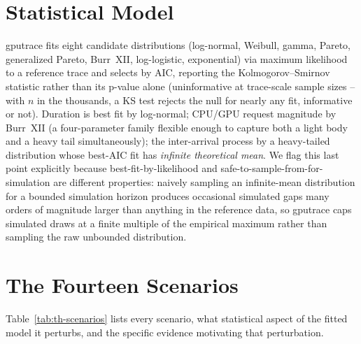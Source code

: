 \documentclass[12pt]{report}
\begin{document}
\section{Statistical Model}
\label{sec:th-stat-model}
gputrace fits eight candidate distributions (log-normal, Weibull, gamma,
Pareto, generalized Pareto, Burr~XII, log-logistic, exponential) via
maximum likelihood to a reference trace and selects by AIC, reporting the
Kolmogorov--Smirnov statistic rather than its p-value alone (uninformative
at trace-scale sample sizes -- with $n$ in the thousands, a KS test
rejects the null for nearly any fit, informative or not). Duration is
best fit by log-normal; CPU/GPU request magnitude by Burr~XII
(a four-parameter family flexible enough to capture both a light body and
a heavy tail simultaneously); the inter-arrival process by a heavy-tailed
distribution whose best-AIC fit has \emph{infinite theoretical mean}. We
flag this last point explicitly because best-fit-by-likelihood and
safe-to-sample-from-for-simulation are different properties: naively
sampling an infinite-mean distribution for a bounded simulation horizon
produces occasional simulated gaps many orders of magnitude larger than
anything in the reference data, so gputrace caps simulated draws at a
finite multiple of the empirical maximum rather than sampling the raw
unbounded distribution.

\section{The Fourteen Scenarios}
Table~\ref{tab:th-scenarios} lists every scenario, what statistical
aspect of the fitted model it perturbs, and the specific evidence
motivating that perturbation.
\end{document}
